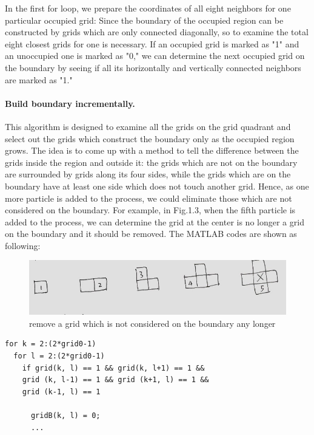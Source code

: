 \documentclass[letterpaper]{article}
\numberwithin{equation}{section} %
\numberwithin{figure}{section} %
\numberwithin{table}{section} %
\begin{document}
\noindent
In the first for loop, we prepare the coordinates of all eight neighbors for one particular occupied grid: Since the boundary of the occupied region can be constructed by grids which are only connected diagonally, so to examine the total eight closest grids for one is necessary. If an occupied grid is marked as "1" and an unoccupied one is marked as "0," we can determine the next occupied grid on the boundary by seeing if all its horizontally and vertically connected neighbors are marked as "1."

\paragraph{Build boundary incrementally.} 
This algorithm is designed to examine all the grids on the grid quadrant and select out the grids which construct the boundary only as the occupied region grows. The idea is to come up with a method to tell the difference between the grids inside the region and outside it: the grids which are not on the boundary are surrounded by grids along its four sides, while the grids which are on the boundary have at least one side which does not touch another grid. Hence, as one more particle is added to the process, we could eliminate those which are not considered on the boundary. For example, in Fig.1.3, when the fifth particle is added to the process, we can determine the grid at the center is no longer a grid on the boundary and it should be removed. The MATLAB codes are shown as following: 

\begin{figure}[h]
		\centering
		\includegraphics[width=0.7\linewidth]{bdryAlg2}
		\caption{remove a grid which is not considered on the boundary any longer}
		\label{fig:bdryAlg2}
\end{figure}




\begin{lstlisting}
for k = 2:(2*grid0-1)
  for l = 2:(2*grid0-1)
    if grid(k, l) == 1 && grid(k, l+1) == 1 && 
    grid (k, l-1) == 1 && grid (k+1, l) == 1 && 
    grid (k-1, l) == 1
    
      gridB(k, l) = 0; 
      ...
\end{lstlisting}
\end{document}
